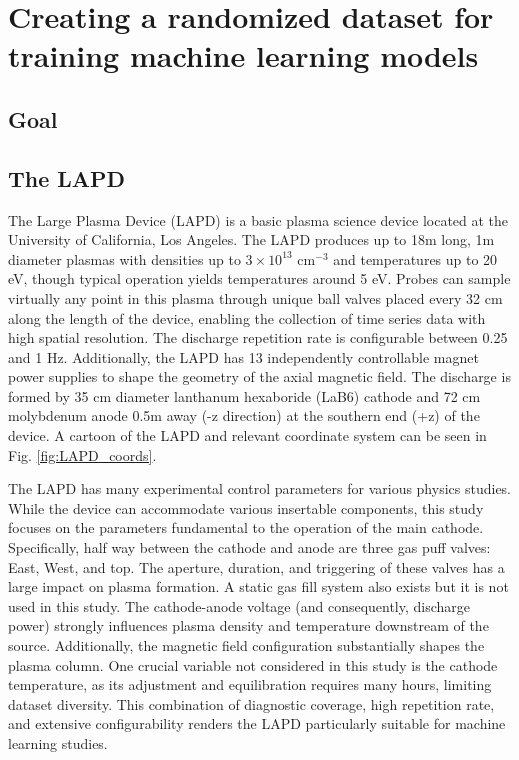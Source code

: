 \graphicspath{{Chapters/Chapter_ml-dataruns/}}

\chapter{Creating a randomized  dataset for training machine learning models}
\label{ch:ml-dataruns}

\section{Goal}

\section{The LAPD}

The Large Plasma Device (LAPD)\cite{gekelman_upgraded_2016,qian_design_2023} is a basic plasma science device located at the University of California, Los Angeles. The LAPD produces up to 18m long, 1m diameter plasmas  with densities up to $3 \times 10^{13}$ cm$^{-3}$ and temperatures up to 20 eV, though typical operation yields temperatures around 5 eV. Probes can sample virtually any point in this plasma through  unique ball valves placed every 32 cm along the length of the device, enabling the collection of time series data with high spatial resolution. The discharge repetition rate is configurable between 0.25 and 1 Hz. Additionally, the LAPD has 13 independently controllable magnet power supplies to shape the geometry of the axial magnetic field. The discharge is formed by 35 cm diameter lanthanum hexaboride (LaB6) cathode\cite{qian_design_2023} and 72 cm molybdenum anode 0.5m away (-z direction) at the southern end (+z) of the device. A cartoon of the LAPD and relevant coordinate system can be seen in Fig. \ref{fig:LAPD_coords}. 


The LAPD has many experimental control parameters for various physics studies. While the device can accommodate various insertable components, this study focuses on the parameters fundamental to the operation of the main cathode. Specifically, half way between the cathode and anode are three gas puff valves: East, West, and top. The aperture, duration, and triggering of these valves has a large impact on plasma formation. A static gas fill system also exists but it is not used in this study. The cathode-anode voltage (and consequently, discharge power) strongly influences plasma density and temperature downstream of the source. Additionally, the magnetic field configuration substantially shapes the plasma column. One crucial variable not considered in this study is the cathode temperature, as its adjustment and equilibration requires many hours, limiting dataset diversity. This combination of diagnostic coverage, high repetition rate, and extensive configurability renders the LAPD particularly suitable for machine learning studies. 


